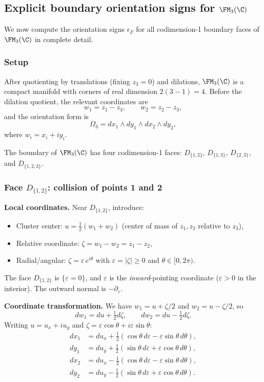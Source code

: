 \subsection{Explicit boundary orientation signs for $\FM_3(\C)$}
\label{subsec:FM3-orientations}

We now compute the orientation signs $\epsilon_F$ for all codimension-1 boundary faces of $\FM_3(\C)$ in complete detail.

\subsubsection{Setup}

After quotienting by translations (fixing $z_3 = 0$) and dilations, $\FM_3(\C)$ is a compact manifold with corners of real dimension $2(3-1) = 4$. Before the dilation quotient, the relevant coordinates are
\[
w_1 = z_1 - z_3,\qquad w_2 = z_2 - z_3,
\]
and the orientation form is
\begin{equation}
\label{eq:Omega3}
\Omega_3 = dx_1\wedge dy_1 \wedge dx_2 \wedge dy_2,
\end{equation}
where $w_i = x_i + iy_i$.

The boundary of $\FM_3(\C)$ has four codimension-1 faces: $D_{\{1,2\}}$, $D_{\{1,3\}}$, $D_{\{2,3\}}$, and $D_{\{1,2,3\}}$.

\subsubsection{Face $D_{\{1,2\}}$: collision of points 1 and 2}

\textbf{Local coordinates.} Near $D_{\{1,2\}}$, introduce:
\begin{itemize}
\item Cluster center: $u = \frac{1}{2}(w_1 + w_2)$ (center of mass of $z_1, z_2$ relative to $z_3$),
\item Relative coordinate: $\zeta = w_1 - w_2 = z_1 - z_2$,
\item Radial/angular: $\zeta = \varepsilon\, e^{i\theta}$ with $\varepsilon = |\zeta| \ge 0$ and $\theta \in [0,2\pi)$.
\end{itemize}
The face $D_{\{1,2\}}$ is $\{\varepsilon = 0\}$, and $\varepsilon$ is the \emph{inward}-pointing coordinate ($\varepsilon > 0$ in the interior). The outward normal is $-\partial_\varepsilon$.

\textbf{Coordinate transformation.} We have $w_1 = u + \zeta/2$ and $w_2 = u - \zeta/2$, so
\[
dw_1 = du + \tfrac{1}{2}d\zeta, \qquad dw_2 = du - \tfrac{1}{2}d\zeta.
\]
Writing $u = u_x + iu_y$ and $\zeta = \varepsilon\cos\theta + i\varepsilon\sin\theta$:
\begin{align*}
dx_1 &= du_x + \tfrac{1}{2}(\cos\theta\,d\varepsilon - \varepsilon\sin\theta\,d\theta),\\
dy_1 &= du_y + \tfrac{1}{2}(\sin\theta\,d\varepsilon + \varepsilon\cos\theta\,d\theta),\\
dx_2 &= du_x - \tfrac{1}{2}(\cos\theta\,d\varepsilon - \varepsilon\sin\theta\,d\theta),\\
dy_2 &= du_y - \tfrac{1}{2}(\sin\theta\,d\varepsilon + \varepsilon\cos\theta\,d\theta).
\end{align*}

